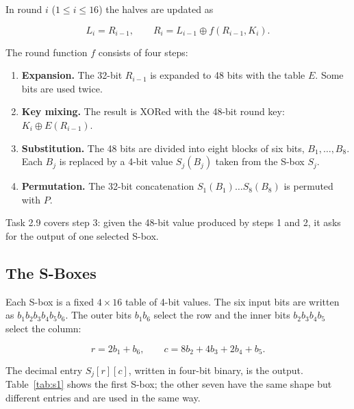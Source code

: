 \documentclass[12pt,a4paper]{article}
\begin{document}
In round $i$ ($1\le i\le 16$) the halves are updated as

\begin{equation}
  L_i = R_{i-1}, \qquad R_i = L_{i-1} \oplus f(R_{i-1}, K_i).
\end{equation}

The round function $f$ consists of four steps:

\begin{enumerate}
  \item \textbf{Expansion.} The 32-bit $R_{i-1}$ is expanded to 48 bits with the table $E$. Some bits are used twice.
  \item \textbf{Key mixing.} The result is XORed with the 48-bit round key: $K_i \oplus E(R_{i-1})$.
  \item \textbf{Substitution.} The 48 bits are divided into eight blocks of six bits, $B_1,\ldots,B_8$. Each $B_j$ is replaced by a 4-bit value $S_j(B_j)$ taken from the S-box $S_j$.
  \item \textbf{Permutation.} The 32-bit concatenation $S_1(B_1)\ldots S_8(B_8)$ is permuted with $P$.
\end{enumerate}

Task 2.9 covers step 3: given the 48-bit value produced by steps 1 and 2, it asks for the output of one selected S-box.

\subsection{The S-Boxes}

Each S-box is a fixed $4\times16$ table of 4-bit values. The six input bits are written as $b_1b_2b_3b_4b_5b_6$. The outer bits $b_1b_6$ select the row and the inner bits $b_2b_3b_4b_5$ select the column:

\begin{equation}
  r = 2b_1 + b_6, \qquad c = 8b_2 + 4b_3 + 2b_4 + b_5.
\end{equation}

The decimal entry $S_j[r][c]$, written in four-bit binary, is the output. Table~\ref{tab:s1} shows the first S-box; the other seven have the same shape but different entries and are used in the same way.
\end{document}
